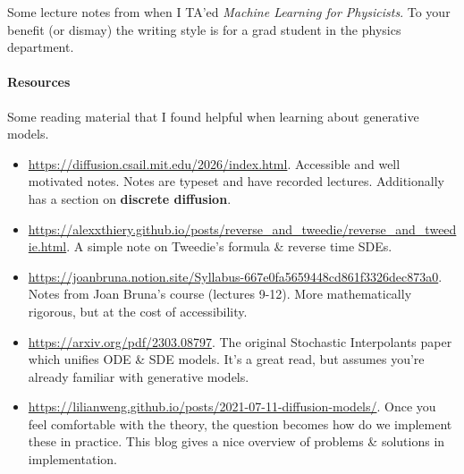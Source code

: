 

Some lecture notes from when I TA'ed \emph{Machine Learning for Physicists}. To your benefit (or dismay) the writing style is for a grad student in the physics department. 

\paragraph{Resources} Some reading material that I found helpful when learning about generative models.
\begin{itemize}
	\item \url{https://diffusion.csail.mit.edu/2026/index.html}. Accessible and well motivated notes. Notes are typeset and have recorded lectures. Additionally has a section on \textbf{discrete diffusion}.
	\item \url{https://alexxthiery.github.io/posts/reverse_and_tweedie/reverse_and_tweedie.html}. A simple note on Tweedie's formula \& reverse time SDEs.
	\item \url{https://joanbruna.notion.site/Syllabus-667e0fa5659448cd861f3326dec873a0}. Notes from Joan Bruna's course (lectures 9-12). More mathematically rigorous, but at the cost of accessibility.
	\item \url{https://arxiv.org/pdf/2303.08797}. The original Stochastic Interpolants paper which unifies ODE \& SDE models. It's a great read, but assumes you're already familiar with generative models.
	\item \url{https://lilianweng.github.io/posts/2021-07-11-diffusion-models/}. Once you feel comfortable with the theory, the question becomes how do we implement these in practice. This blog gives a nice overview of problems \& solutions in implementation.
\end{itemize}


